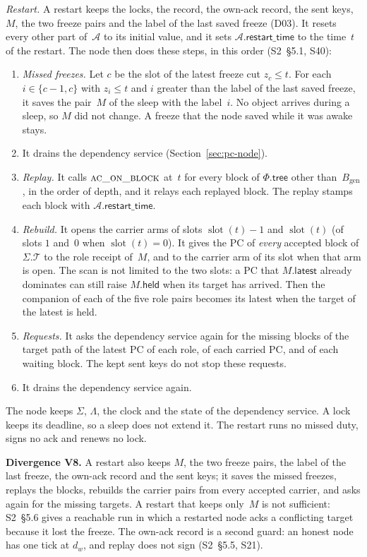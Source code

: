 \documentclass{article}
\newcommand{\genesis}{B_{\mathrm{gen}}}
\newcommand{\slot}{\operatorname{slot}}
\newcommand{\T}{\mathcal T}
\newcommand{\AC}{\mathcal A}
\newcommand{\Fr}{\Phi}
\newcommand{\tree}{\mathsf{tree}}
\newcommand{\restartTime}{\mathsf{restart\_time}}
\newcommand{\PCdiv}[2]{\par\noindent\textbf{Divergence #1.} #2\par}
\begin{document}
\emph{Restart.}  A restart keeps the locks, the record, the own-ack
record, the sent keys, $M$, the two freeze pairs and the label of the last
saved freeze (D03).  It resets every other part of~$\AC$ to its initial
value, and it sets $\AC.\restartTime$ to the time~$t$ of the restart.  The
node then does these steps, in this order (S2~\S5.1, S40):
\begin{enumerate}
\item \emph{Missed freezes.}  Let $c$ be the slot of the latest freeze cut
  $z_c\leq t$.  For each $i\in\{c-1,c\}$ with $z_i\leq t$ and $i$ greater
  than the label of the last saved freeze, it saves the pair~$M$ of the
  sleep with the label~$i$.  No object arrives during a sleep, so $M$ did
  not change.  A freeze that the node saved while it was awake stays.
\item It drains the dependency service (Section~\ref{sec:pc-node}).
\item \emph{Replay.}  It calls $\Call{ac\_on\_block}{}$ at~$t$ for every
  block of $\Fr.\tree$ other than~$\genesis$, in the order of depth, and it
  relays each replayed block.  The replay stamps each block with
  $\AC.\restartTime$.
\item \emph{Rebuild.}  It opens the carrier arms of slots $\slot(t)-1$ and
  $\slot(t)$ (of slots $1$ and~$0$ when $\slot(t)=0$).  It gives the PC of
  \emph{every} accepted block of $\Sigma.\T$ to the role receipt of~$M$,
  and to the carrier arm of its slot when that arm is open.  The scan is
  not limited to the two slots: a PC that $M.\mathsf{latest}$ already
  dominates can still raise $M.\mathsf{held}$ when its target has arrived.
  Then the companion of each of the five role pairs becomes its latest when
  the target of the latest is held.
\item \emph{Requests.}  It asks the dependency service again for the
  missing blocks of the target path of the latest PC of each role, of each
  carried PC, and of each waiting block.  The kept sent keys do not stop
  these requests.
\item It drains the dependency service again.
\end{enumerate}
The node keeps $\Sigma$, $\Lambda$, the clock and the state of the
dependency service.  A lock keeps its deadline, so a sleep does not extend
it.  The restart runs no missed duty, signs no ack and renews no lock.

\PCdiv{V8}{A restart also keeps $M$, the two freeze pairs, the label of
the last freeze, the own-ack record and the sent keys; it saves the
missed freezes, replays the blocks, rebuilds the carrier pairs from every
accepted carrier, and asks again for the missing targets.  A restart
that keeps only~$M$ is not sufficient: S2~\S5.6 gives a reachable run in
which a restarted node acks a conflicting target because it lost the
freeze.  The own-ack record is a second guard: an honest node has one tick
at $d_w$, and replay does not sign (S2~\S5.5, S21).}
\end{document}
